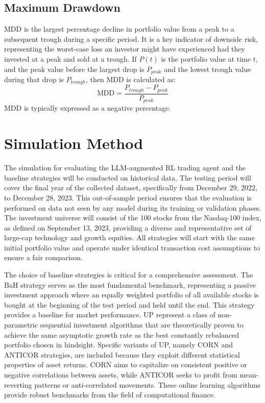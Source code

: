 \subsection{Maximum Drawdown}
\gls{MDD} is the largest percentage decline in portfolio value from a peak to a subsequent trough during a specific period. It is a key indicator of downside risk, representing the worst-case loss an investor might have experienced had they invested at a peak and sold at a trough. If \(P(t)\) is the portfolio value at time \(t\), and the peak value before the largest drop is \(P_{peak}\) and the lowest trough value during that drop is \(P_{trough}\), then \gls{MDD} is calculated as:
\[\text{MDD} = \frac{P_{trough} - P_{peak}}{P_{peak}}\]
\gls{MDD} is typically expressed as a negative percentage.

\section{Simulation Method}
The simulation for evaluating the \gls{LLM}-augmented \gls{RL} trading agent and the baseline strategies will be conducted on historical data. The testing period will cover the final year of the collected dataset, specifically from December 29, 2022, to December 28, 2023. This out-of-sample period ensures that the evaluation is performed on data not seen by any model during its training or validation phases. The investment universe will consist of the 100 stocks from the Nasdaq-100 index, as defined on September 13, 2023, providing a diverse and representative set of large-cap technology and growth equities. All strategies will start with the same initial portfolio value and operate under identical transaction cost assumptions to ensure a fair comparison.

The choice of baseline strategies is critical for a comprehensive assessment. The \gls{BaH} strategy serves as the most fundamental benchmark, representing a passive investment approach where an equally weighted portfolio of all available stocks is bought at the beginning of the test period and held until the end. This strategy provides a baseline for market performance. \gls{UP} represent a class of non-parametric sequential investment algorithms that are theoretically proven to achieve the same asymptotic growth rate as the best constantly rebalanced portfolio chosen in hindsight. Specific variants of \gls{UP}, namely \gls{CORN} and \gls{ANTICOR} strategies, are included because they exploit different statistical properties of asset returns. \gls{CORN} aims to capitalize on consistent positive or negative correlations between assets, while \gls{ANTICOR} seeks to profit from mean-reverting patterns or anti-correlated movements. These online learning algorithms provide robust benchmarks from the field of computational finance.

